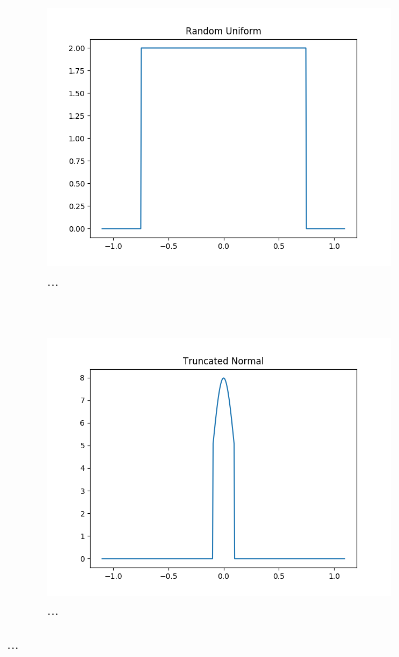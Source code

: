 \begin{figure}[h!]
\begin{subfigure}[t]{0.5\textwidth}
		\includegraphics[width=\textwidth]{img/methodology_neuralNetwork_initializerFunctions_randomUniform.png}
		\caption{...}
	\end{subfigure}%
	~ 
	\begin{subfigure}[t]{0.5\textwidth}
		\centering
		\includegraphics[width=\textwidth]{img/methodology_neuralNetwork_initializerFunctions_truncatedNormal.png}
		\caption{...}
	\end{subfigure}
	\caption{...}
	\label{pic:methodology_neuralNetwork_initializerFunctions}
\end{figure}


